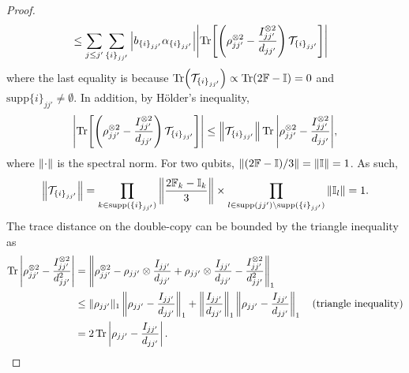 \documentclass[showpacs,amsmath,amssymb,twocolumn,aps,pra,superscriptaddress,notitlepage,10pt]{revtex4-2}
\newcommand{\supp}{\mathrm{supp}}
\begin{document}
\begin{proof}
\begin{equation}
\begin{aligned}
            &\le\sum_{j\le j'}\sum_{\{i\}_{jj'}}\abs{b_{\{i\}_{jj'}}\alpha_{\{i\}_{jj'}}}\abs{\Tr[\left(\rho_{jj'}^{\otimes 2}-\frac{I_{jj'}^{\otimes 2}}{d_{jj'}}\right)\mathcal T_{\{i\}_{jj'}}]}
        \end{aligned}
    \end{equation}
    where the last equality is because $\Tr(\mathcal T_{\{i\}_{jj'}})\propto\Tr(2\mathbb F-\mathbb I)=0$ and $\supp{\{i\}_{jj'}}\neq \emptyset$. In addition, by Hölder's inequality,
    \begin{equation}
        \abs{\Tr[\left(\rho_{jj'}^{\otimes 2}-\frac{I_{jj'}^{\otimes 2}}{d_{jj'}}\right)\mathcal T_{\{i\}_{jj'}}]}\le\norm{\mathcal T_{\{i\}_{jj'}}}\Tr\abs{\rho_{jj'}^{\otimes 2}-\frac{I_{jj'}^{\otimes 2}}{d_{jj'}}},
    \end{equation}
    where $\norm{\cdot}$ is the spectral norm. For two qubits, $\left \|(2\mathbb F-\mathbb I)/3\right\|=\norm{\mathbb I}=1$. As such,
    \begin{equation}
        \norm{\mathcal T_{\{i\}_{jj'}}}=\prod_{k\in\supp(\{i\}_{jj'})}\norm{\frac{2\mathbb F_k-\mathbb I_k}{3}}\times\prod_{l\in\supp(jj')\setminus\supp(\{i\}_{jj'})}\norm{\mathbb I_l}=1.
    \end{equation}
    The trace distance on the double-copy can be bounded by the triangle inequality as
    \begin{align}
        \Tr\left|\rho^{\otimes 2}_{jj'}-\frac{I_{jj'}^{\otimes 2}}{d_{jj'}^2}\right|&=\left\|\rho^{\otimes 2}_{jj'}-\rho_{jj'}\otimes \frac{I_{jj'}}{d_{jj'}}+\rho_{jj'}\otimes \frac{I_{jj'}}{d_{jj'}}-\frac{I_{jj'}^{\otimes 2}}{d_{jj'}^2}\right\|_1\notag\\
         &\leq\|\rho_{jj'}\|_1\left\|\rho_{jj'}-\frac{I_{jj'}}{d_{jj'}}\right\|_1+\left\|\frac{I_{jj'}}{d_{jj'}}\right\|_1\left\|\rho_{jj'}-\frac{I_{jj'}}{d_{jj'}}\right\|_1\quad\text{(triangle inequality)}\notag\\
         &=2\Tr\left|\rho_{jj'}-\frac{I_{jj'}}{d_{jj'}}\right|.\notag
    \end{align}


\end{proof}
\end{document}
